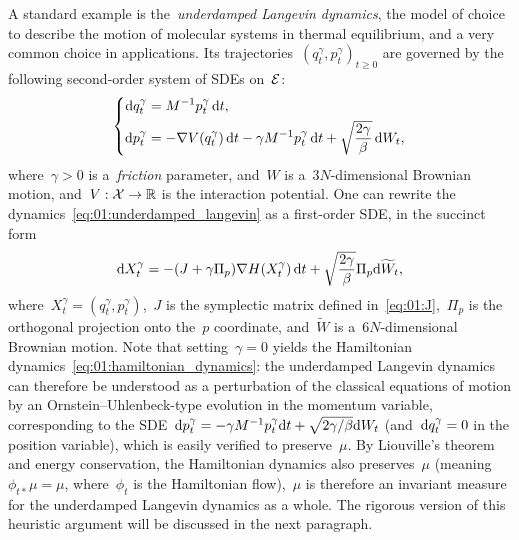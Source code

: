A standard example is the~\textit{underdamped Langevin dynamics}, the model of choice to describe the motion of molecular systems in thermal equilibrium, and a very common choice in applications.
Its trajectories~$(q^\gamma_t, p^\gamma_t)_{t\geq 0}$ are governed by the following second-order system of SDEs on~$\mathcal{E}$:
\begin{equation}
    \label{eq:01:underdamped_langevin}
    \left\{\begin{aligned}
    \mathrm{d} q^\gamma_t &= M^{-1}p^\gamma_t\,\mathrm{d} t,\\
    \mathrm{d} p^\gamma_t &= -\nabla V(q^\gamma_t)\,\mathrm{d} t -\gamma M^{-1}p^\gamma_t\,\mathrm{d} t + \sqrt{\frac{2\gamma}{\beta}}\,\mathrm{d} W_t,
    \end{aligned}\right.
\end{equation}
where~$\gamma>0$ is a~\textit{friction} parameter, and~$W$ is a~$3N$-dimensional Brownian motion, and~$V:\mathcal{X}\to\mathbb{R}$ is the interaction potential.
One can rewrite the dynamics~\eqref{eq:01:underdamped_langevin} as a first-order SDE, in the succinct form
\begin{equation}
    \label{eq:01:underdamped_langevin_succinct}
    \mathrm{d} X_t^\gamma= -(J+\gamma \Pi_p)\nabla H(X_t^\gamma)\,\mathrm{d} t + \sqrt{\frac{2\gamma}{\beta}}\Pi_p\mathrm{d} \widetilde{W}_t,
\end{equation}
where~$X_t^\gamma=(q_t^\gamma,p_t^\gamma)$,~$J$ is the symplectic matrix defined in~\eqref{eq:01:J},~$\Pi_p$ is the orthogonal projection onto the~$p$ coordinate, and~$\widetilde{W}$ is a~$6N$-dimensional Brownian motion.
Note that setting~$\gamma=0$ yields the Hamiltonian dynamics~\eqref{eq:01:hamiltonian_dynamics}: the underdamped Langevin dynamics can therefore be understood as a perturbation of the classical equations of motion by an Ornstein--Uhlenbeck-type evolution in the momentum variable, corresponding to the SDE~$\mathrm{d} p_t^\gamma = -\gamma M^{-1}p_t^\gamma\mathrm{d} t + \sqrt{2\gamma/\beta}\mathrm{d} W_t$ (and~$\mathrm{d} q_t^\gamma= 0$ in the position variable), which is easily verified to preserve~$\mu$.
By Liouville's theorem and energy conservation, the Hamiltonian dynamics also preserves~$\mu$ (meaning~$\phi_{t*}\mu=\mu$, where~$\phi_t$ is the Hamiltonian flow),~$\mu$ is therefore an invariant measure for the underdamped Langevin dynamics as a whole. The rigorous version of this heuristic argument will be discussed in the next paragraph.


